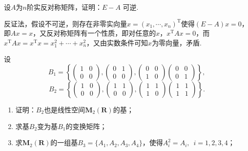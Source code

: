 \begin{exercise}
\begin{exgroup}
        \item 设$A$为$n$阶实反对称矩阵，证明：$E-A$ 可逆.
        \begin{answer}
            反证法，假设不可逆，则存在非零实向量$x=(x_1,\cdots,x_n)^\mathrm{T}$使得$(E-A)x=0$，即$Ax=x$，又反对称矩阵有一个性质，即对任意的$x$，$x^\mathrm{T}Ax=0$，而$x^\mathrm{T}Ax=x^\mathrm{T}x=x_1^2+\cdots+x_n^2$，又由实数条件可知$x$为零向量，矛盾.
        \end{answer}

        \item 设
        \[B_1=\left\{\begin{pmatrix}
                1 & 0 \\ 0 & 0
            \end{pmatrix},\begin{pmatrix}
                0 & 1 \\ 0 & 0
            \end{pmatrix},\begin{pmatrix}
                0 & 0 \\ 1 & 0
            \end{pmatrix}\begin{pmatrix}
                0 & 0 \\ 0 & 1
            \end{pmatrix}\right\},\]
        \[B_2=\left\{\begin{pmatrix}
                1 & 0 \\ 0 & 0
            \end{pmatrix},\begin{pmatrix}
                1 & 1 \\ 0 & 0
            \end{pmatrix},\begin{pmatrix}
                1 & 1 \\ 1 & 0
            \end{pmatrix}\begin{pmatrix}
                1 & 1 \\ 1 & 1
            \end{pmatrix}\right\}.\]
        \begin{enumerate}
            \item 证明：$B_2$也是线性空间$\mathbf{M}_2(\mathbf{R})$的基；

            \item 求基$B_2$变为基$B_1$的变换矩阵；

            \item 求$\mathbf{M}_2(\mathbf{R})$的一组基$B_3=\{A_1,A_2,A_3,A_4\}$，使得$A_i^2=A_i,\enspace i=1,2,3,4$；


\end{enumerate}
\end{exgroup}
\end{exercise}
